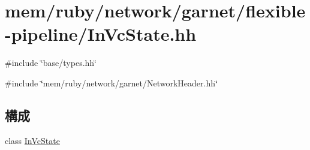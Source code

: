 \hypertarget{InVcState_8hh}{
\section{mem/ruby/network/garnet/flexible-\/pipeline/InVcState.hh}
\label{InVcState_8hh}
}
{\ttfamily \#include \char`\"{}base/types.hh\char`\"{}}\par
{\ttfamily \#include \char`\"{}mem/ruby/network/garnet/NetworkHeader.hh\char`\"{}}\par
\subsection*{構成}
\begin{DoxyCompactItemize}
\item 
class \hyperlink{classInVcState}{InVcState}
\end{DoxyCompactItemize}
